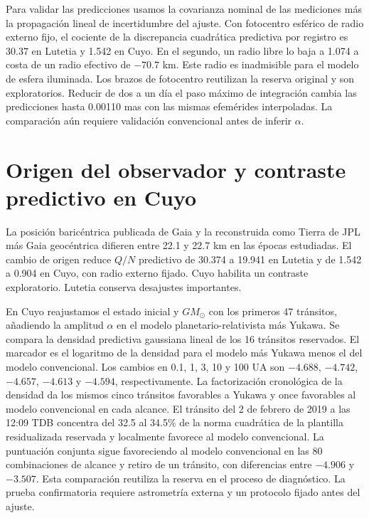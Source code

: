 \documentclass[11pt,a4paper]{article}
\begin{document}
Para validar las predicciones usamos la covarianza nominal de las mediciones más la propagación lineal de incertidumbre del ajuste. Con fotocentro esférico de radio externo fijo, el cociente de la discrepancia cuadrática predictiva por registro es 30.37 en Lutetia y 1.542 en Cuyo. En el segundo, un radio libre lo baja a 1.074 a costa de un radio efectivo de $-70.7$ km. Este radio es inadmisible para el modelo de esfera iluminada. Los brazos de fotocentro reutilizan la reserva original y son exploratorios. Reducir de dos a un día el paso máximo de integración cambia las predicciones hasta 0.00110 mas con las mismas efemérides interpoladas. La comparación aún requiere validación convencional antes de inferir $\alpha$.

\section{Origen del observador y contraste predictivo en Cuyo}

La posición baricéntrica publicada de Gaia y la reconstruida como Tierra de JPL más Gaia geocéntrica difieren entre 22.1 y 22.7 km en las épocas estudiadas. El cambio de origen reduce $Q/N$ predictivo de 30.374 a 19.941 en Lutetia y de 1.542 a 0.904 en Cuyo, con radio externo fijado. Cuyo habilita un contraste exploratorio. Lutetia conserva desajustes importantes.

En Cuyo reajustamos el estado inicial y $GM_\odot$ con los primeros 47 tránsitos, añadiendo la amplitud $\alpha$ en el modelo planetario-relativista más Yukawa. Se compara la densidad predictiva gaussiana lineal de los 16 tránsitos reservados. El marcador es el logaritmo de la densidad para el modelo más Yukawa menos el del modelo convencional. Los cambios en 0.1, 1, 3, 10 y 100 UA son $-4.688$, $-4.742$, $-4.657$, $-4.613$ y $-4.594$, respectivamente. La factorización cronológica de la densidad da los mismos cinco tránsitos favorables a Yukawa y once favorables al modelo convencional en cada alcance. El tránsito del 2 de febrero de 2019 a las 12:09 TDB concentra del 32.5 al 34.5\% de la norma cuadrática de la plantilla residualizada reservada y localmente favorece al modelo convencional. La puntuación conjunta sigue favoreciendo al modelo convencional en las 80 combinaciones de alcance y retiro de un tránsito, con diferencias entre $-4.906$ y $-3.507$. Esta comparación reutiliza la reserva en el proceso de diagnóstico. La prueba confirmatoria requiere astrometría externa y un protocolo fijado antes del ajuste.
\end{document}

